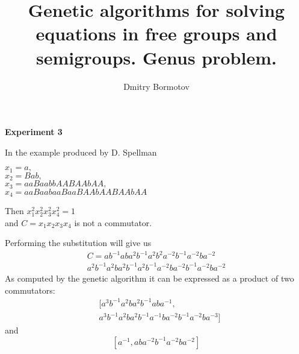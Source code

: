 \documentclass{slides}
\title{Genetic algorithms for solving
equations in free groups and semigroups.  Genus problem.}
\author{Dmitry Bormotov} \date{}
\begin{document}
\pagestyle{empty}

\begin{center} \Large\textbf{Experiment 3} \end{center}

In the example produced by D. Spellman 

$x_1 = a,$ \\
$x_2 = B a b,$ \\
$x_3 = a a B a a b b A A B A A b A A,$ \\
$x_4 = a a B a a b a a B a a B A A b A A B A A b A A$

Then $x_1^2 x_2^2 x_3^2 x_4^2 = 1$ \\ 
and $C = x_1 x_2 x_3 x_4$ is not a commutator.

Performing the substitution will give us 
\begin{eqnarray*}
C = a b^{-1} a b a^2 b^{-1} a^2 b^2 a^{-2} b^{-1} a^{-2} b a^{-2} \\ a^2 b^{-1}
 a^2 b a^2 b^{-1} a^2 b^{-1} a^{-2} b a^{-2} b^{-1} a^{-2} b a^{-2}
\end{eqnarray*}
As computed by the genetic algorithm it can be expressed as a product
of two commutators:
\begin{eqnarray*}
& [a^3 b^{-1} a^2 b a^2 b^{-1} a b a^{-1}, \\
& a^3 b^{-1} a^2 b a^2 b^{-1} a^{-1} b a^{-2} b^{-1} a^{-2} b a^{-3}] 
\end{eqnarray*}
and
\[
[a^{-1}, a b a^{-2} b^{-1} a^{-2} b a^{-2}]
\]
\end{document}
